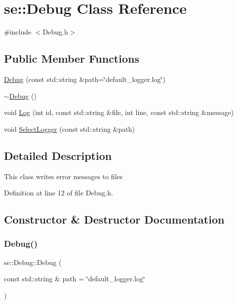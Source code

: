\hypertarget{classse_1_1_debug}{}\section{se\+:\+:Debug Class Reference}
\label{classse_1_1_debug}


{\ttfamily \#include $<$Debug.\+h$>$}

\subsection*{Public Member Functions}
\begin{DoxyCompactItemize}
\item 
\mbox{\hyperlink{classse_1_1_debug_a1292de4f720caa545023e0b4a4735eef}{Debug}} (const std\+::string \&path=\char`\"{}default\+\_\+logger.\+log\char`\"{})
\item 
\mbox{\hyperlink{classse_1_1_debug_a2ff6371c83b2a8918b15907bd1491ac9}{$\sim$\+Debug}} ()
\item 
void \mbox{\hyperlink{classse_1_1_debug_a682e9ff37514ccccfd063a1aff942e2d}{Log}} (int id, const std\+::string \&file, int line, const std\+::string \&message)
\item 
void \mbox{\hyperlink{classse_1_1_debug_ab97d44dca8606c2be2cb709f7e82be09}{Select\+Logger}} (const std\+::string \&path)
\end{DoxyCompactItemize}


\subsection{Detailed Description}
This class writes error messages to files 

Definition at line 12 of file Debug.\+h.



\subsection{Constructor \& Destructor Documentation}
\mbox{\label{classse_1_1_debug_a1292de4f720caa545023e0b4a4735eef}} 
\subsubsection{\texorpdfstring{Debug()}{Debug()}}
{\footnotesize\ttfamily se\+::\+Debug\+::\+Debug (\begin{DoxyParamCaption}\item[{const std\+::string \&}]{path = {\ttfamily \char`\"{}default\+\_\+logger.log\char`\"{}} }\end{DoxyParamCaption})}


